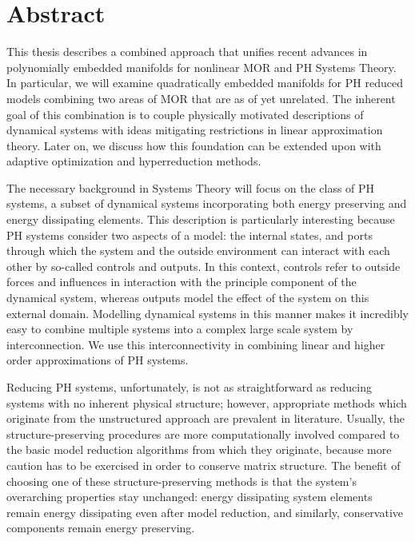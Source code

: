 \chapter*{Abstract}

This thesis describes a combined approach that unifies recent advances in polynomially embedded manifolds for nonlinear \acl{MOR} and \acl{PH} Systems Theory.
In particular, we will examine quadratically embedded manifolds for \acl{PH} reduced models combining two areas of \acl{MOR} that are as of yet unrelated.
The inherent goal of this combination is to couple physically motivated descriptions of dynamical systems with ideas mitigating restrictions in linear approximation theory.
Later on, we discuss how this foundation can be extended upon with adaptive optimization and hyperreduction methods.

The necessary background in Systems Theory will focus on the class of \acl{PH} systems, a subset of dynamical systems incorporating both energy preserving and energy dissipating elements.
This description is particularly interesting because \acl{PH} systems consider two aspects of a model: the internal states, and ports through which the system and the outside environment can interact with each other by so-called controls and outputs.
In this context, controls refer to outside forces and influences in interaction with the principle component of the dynamical system, whereas outputs model the effect of the system on this external domain.
Modelling dynamical systems in this manner makes it incredibly easy to combine multiple systems into a complex large scale system by interconnection.
We use this interconnectivity in combining linear and higher order approximations of \acl{PH} systems.

Reducing \acl{PH} systems, unfortunately, is not as straightforward as reducing systems with no inherent physical structure; however, appropriate methods which originate from the unstructured approach are prevalent in literature.
Usually, the structure-preserving procedures are more computationally involved compared to the basic model reduction algorithms from which they originate, because more caution has to be exercised in order to conserve matrix structure.
The benefit of choosing one of these structure-preserving methods is that the system's overarching properties stay unchanged: energy dissipating system elements remain energy dissipating even after model reduction, and similarly, conservative components remain energy preserving.

